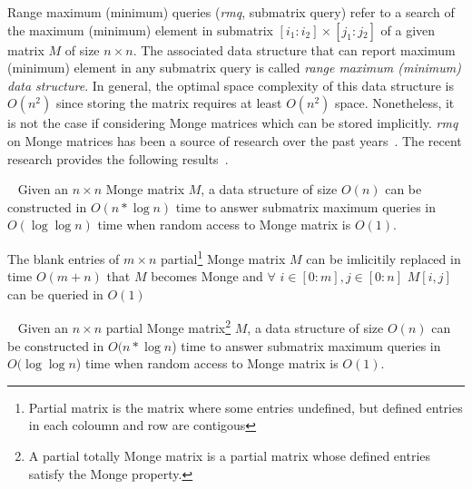Range maximum (minimum) que\-ries (\emph{rmq}, submatrix query) refer to a search of the maximum (minimum) element in submatrix $[i_{1}:i{_2}]\times [j_{1}:j{_2}]$ of a given matrix $M$ of size $n \times n$.
The associated data structure that can report maximum (minimum) element in any submatrix query is called \emph{range maximum (minimum) data structure}.
In general, the optimal space complexity of this data structure is $O(n^2)$ since storing the matrix requires at least $O(n^2)$ space.
Nonetheless, it is not the case if considering Monge matrices which can be stored implicitly.
\emph{rmq} on Monge matrices has been a source of research over the past years~\cite{gawrychowski2014improved,kaplan2012submatrix,bost2013submatrix}.
The recent research provides the following results~\cite{gawrychowski2020submatrix}.

\begin{theorem}~\cite{gawrychowski2020submatrix}
Given an $n \times n$ Monge matrix $M$, a data structure of size $O(n)$ can be constructed in $O(n * \log n)$ time to answer submatrix maximum queries in $O(\log \log n)$ time when random access to Monge matrix is $O(1)$.
\end{theorem}


\begin{lemma}\cite{gawrychowski2020submatrix}\label{lemma}
The blank entries of  $m \times n $ partial\footnote{Partial matrix is the matrix where some entries undefined, but defined entries in each coloumn and row are contigous} Monge matrix $M$
can be imlicitily replaced in time $O(m+n)$ that 
$M$ becomes Monge and $\forall$ $i \in [0:m],j \in [0:n]$ $M[i,j]$ 
can be queried in $O(1)$ 
\end{lemma}
\begin{theorem}~\cite{gawrychowski2020submatrix}\label{partialTheorem}
Given an $n \times n$ partial Monge matrix\footnote{A partial totally Monge matrix is a partial matrix whose defined entries satisfy the Monge property.} $M$, a data structure of size $O(n)$ can be constructed in $O(n * \log n$) time to answer submatrix maximum queries in $O(\log \log n$) time when random access to Monge matrix is $O(1)$.
\end{theorem}

